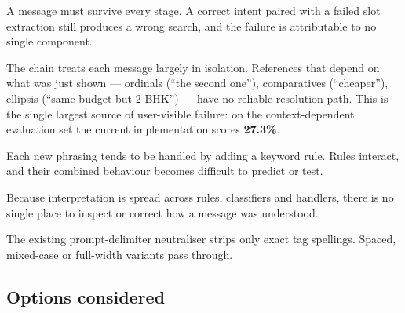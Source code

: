 \documentclass[11pt,a4paper]{article}
\begin{document}
\begin{description}[leftmargin=1.4em,style=nextline]
\item[Compounding stage errors.] A message must survive every stage. A correct intent paired
with a failed slot extraction still produces a wrong search, and the failure is attributable
to no single component.

\item[Near-absent conversational memory.] The chain treats each message largely in isolation.
References that depend on what was just shown --- ordinals (``the second one''), comparatives
(``cheaper''), ellipsis (``same budget but 2 BHK'') --- have no reliable resolution path. This
is the single largest source of user-visible failure: on the context-dependent evaluation set
the current implementation scores \textbf{27.3\%}.

\item[Rule proliferation.] Each new phrasing tends to be handled by adding a keyword rule.
Rules interact, and their combined behaviour becomes difficult to predict or test.

\item[Unclear ownership of correctness.] Because interpretation is spread across rules,
classifiers and handlers, there is no single place to inspect or correct how a message was
understood.

\item[Fragile delimiter handling.] The existing prompt-delimiter neutraliser strips only
exact tag spellings. Spaced, mixed-case or full-width variants pass through.
\end{description}

\subsection{Options considered}
\end{document}
